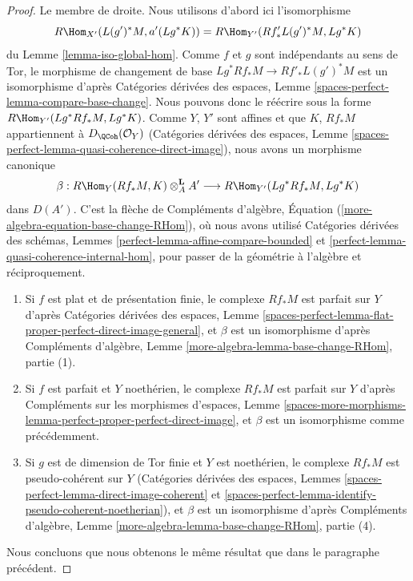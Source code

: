 \begin{proof}
\medskip\noindent
Le membre de droite. Nous utilisons d'abord ici l'isomorphisme
$$
R\Hom_{X'}(L(g')^*M, a'(Lg^*K)) = R\Hom_{Y'}(Rf'_*L(g')^*M, Lg^*K)
$$
du Lemme \ref{lemma-iso-global-hom}. Comme $f$ et $g$ sont
indépendants au sens de Tor, le morphisme de changement de base
$Lg^*Rf_*M \to Rf'_*L(g')^*M$ est un isomorphisme d'après
Catégories dérivées des espaces, Lemme
\ref{spaces-perfect-lemma-compare-base-change}.
Nous pouvons donc le réécrire sous la forme $R\Hom_{Y'}(Lg^*Rf_*M, Lg^*K)$.
Comme $Y$, $Y'$ sont affines et que $K$, $Rf_*M$ appartiennent à $D_\QCoh(\mathcal{O}_Y)$
(Catégories dérivées des espaces, Lemme
\ref{spaces-perfect-lemma-quasi-coherence-direct-image}),
nous avons un morphisme canonique
$$
\beta :
R\Hom_Y(Rf_*M, K) \otimes^\mathbf{L}_A A'
\longrightarrow
R\Hom_{Y'}(Lg^*Rf_*M, Lg^*K)
$$
dans $D(A')$. C'est la flèche de
Compléments d'algèbre, Équation (\ref{more-algebra-equation-base-change-RHom}),
où nous avons utilisé Catégories dérivées des schémas, Lemmes
\ref{perfect-lemma-affine-compare-bounded} et
\ref{perfect-lemma-quasi-coherence-internal-hom},
pour passer de la géométrie à l'algèbre et réciproquement.
\begin{enumerate}
\item Si $f$ est plat et de présentation finie, le complexe $Rf_*M$
est parfait sur $Y$ d'après Catégories dérivées des espaces, Lemme
\ref{spaces-perfect-lemma-flat-proper-perfect-direct-image-general},
et $\beta$ est un isomorphisme d'après
Compléments d'algèbre, Lemme \ref{more-algebra-lemma-base-change-RHom}, partie (1).
\item Si $f$ est parfait et $Y$ noethérien, le complexe $Rf_*M$
est parfait sur $Y$ d'après Compléments sur les morphismes d'espaces, Lemme
\ref{spaces-more-morphisms-lemma-perfect-proper-perfect-direct-image},
et $\beta$ est un isomorphisme comme précédemment.
\item Si $g$ est de dimension de Tor finie et $Y$ est noethérien,
le complexe $Rf_*M$ est pseudo-cohérent sur $Y$
(Catégories dérivées des espaces, Lemmes
\ref{spaces-perfect-lemma-direct-image-coherent} et
\ref{spaces-perfect-lemma-identify-pseudo-coherent-noetherian}),
et $\beta$ est un isomorphisme d'après
Compléments d'algèbre, Lemme \ref{more-algebra-lemma-base-change-RHom}, partie (4).
\end{enumerate}
Nous concluons que nous obtenons le même résultat que dans le paragraphe précédent.


\end{proof}
